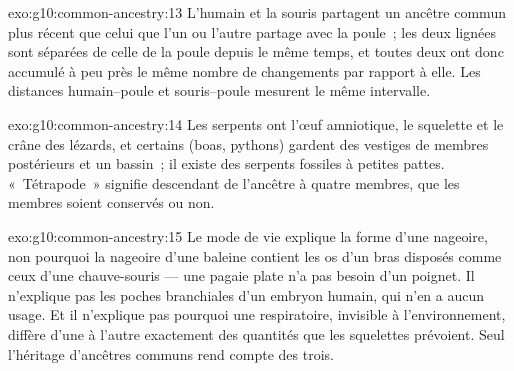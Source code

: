 \begin{solution}{exo:g10:common-ancestry:13}
L'humain et la souris partagent un ancêtre commun plus récent que celui
que l'un ou l'autre partage avec la poule~; les deux lignées sont
séparées de celle de la poule depuis le même temps, et toutes deux ont
donc accumulé à peu près le même nombre de changements par rapport à
elle. Les distances humain--poule et souris--poule mesurent le même
intervalle.
\end{solution}

\begin{solution}{exo:g10:common-ancestry:14}
Les serpents ont l'œuf amniotique, le squelette et le crâne des
lézards, et certains (boas, pythons) gardent des vestiges de membres
postérieurs et un bassin~; il existe des serpents fossiles à petites
pattes. «~Tétrapode~» signifie descendant de l'ancêtre à quatre
membres, que les membres soient conservés ou non.
\end{solution}

\begin{solution}{exo:g10:common-ancestry:15}
Le mode de vie explique la forme d'une nageoire, non pourquoi la
nageoire d'une baleine contient les os d'un bras disposés comme ceux
d'une chauve-souris --- une pagaie plate n'a pas besoin d'un poignet.
Il n'explique pas les poches branchiales d'un embryon humain, qui n'en
a aucun usage. Et il n'explique pas pourquoi une 
respiratoire, invisible à l'environnement, diffère d'une  à
l'autre exactement des quantités que les squelettes prévoient. Seul
l'héritage d'ancêtres communs rend compte des trois.
\end{solution}

